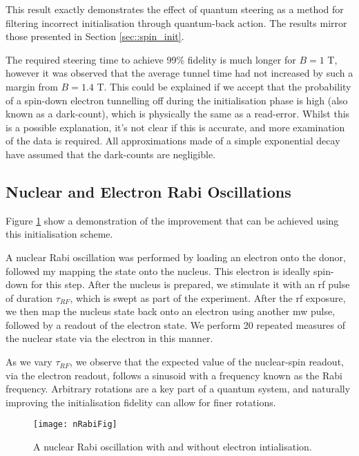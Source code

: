	This result exactly demonstrates the effect of quantum steering as a method for filtering incorrect initialisation through quantum-back action. The results mirror those presented in Section \ref{sec::spin_init}.
	
	The required steering time to achieve 99\% fidelity is much longer for $B = 1$ T, however it was observed that the average tunnel time had not increased by such a margin from $B = 1.4$ T. This could be explained if we accept that the probability of a spin-down electron tunnelling off during the initialisation phase is high (also known as a dark-count), which is physically the same as a read-error. Whilst this is a possible explanation, it's not clear if this is accurate, and more examination of the data is required. All approximations made of a simple exponential decay have assumed that the dark-counts are negligible.

\subsection{Nuclear and Electron Rabi Oscillations}
	Figure \ref{fig::nuclear_rabi} show a demonstration of the improvement that can be achieved using this initialisation scheme.
	
	A nuclear Rabi oscillation was performed by loading an electron onto the donor, followed my mapping the state onto the nucleus. This electron is ideally spin-down for this step. After the nucleus is prepared, we stimulate it with an \gls{rf} pulse of duration $\tau_{RF}$, which is swept as part of the experiment. After the \gls{rf} exposure, we then map the nucleus state back onto an electron using another \gls{mw} pulse, followed by a readout of the electron state. We perform 20 repeated measures of the nuclear state via the electron in this manner.
	
	As we vary $\tau_{RF}$, we observe that the expected value of the nuclear-spin readout, via the electron readout, follows a sinusoid with a frequency known as the Rabi frequency. Arbitrary rotations are a key part of a quantum system, and naturally improving the initialisation fidelity can allow for finer rotations.
	
	\begin{figure}[H]
		\centering
		\texttt{[image: nRabiFig]}
		\caption{A nuclear Rabi oscillation with and without electron intialisation.}
		\label{fig::nuclear_rabi}
	\end{figure}
	
